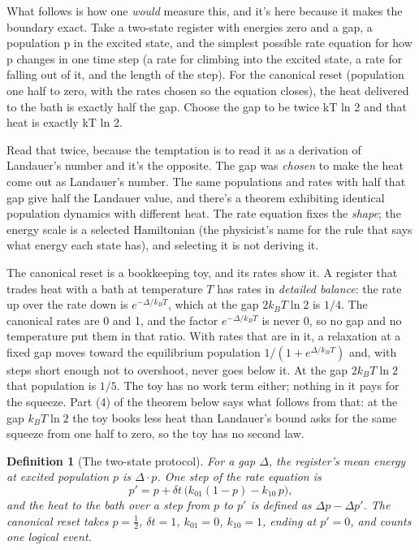 \documentclass[11pt,twoside]{article}
\theoremstyle{thielethm}
\theoremstyle{thieledef}
\newtheorem{definition}{Definition}[section]
\theoremstyle{thieledef}
\theoremstyle{thieledef}
\theoremstyle{thielethm}
\theoremstyle{thieleobs}
\theoremstyle{thielethm}
\begin{document}
What follows is how one \emph{would} measure this, and it's here because it makes the boundary exact. Take a two-state
register with energies zero and a gap, a population p in the excited state, and the simplest
possible rate equation for how p changes in one time step (a rate for climbing into the
excited state, a rate for falling out of it, and the length of the step). For the canonical reset
(population one half to zero, with the rates chosen so the equation closes), the heat
delivered to the bath is exactly half the gap. Choose the gap
to be twice kT ln 2 and that heat is exactly kT ln 2.

Read that twice, because the temptation is to read it as a derivation of Landauer's number
and it's the opposite. The gap was \emph{chosen} to make the heat come out as Landauer's number.
The same populations and rates with half that gap give half the Landauer value, and there's
a theorem exhibiting identical population dynamics with different heat. The rate equation fixes the \emph{shape}; the energy
scale is a selected Hamiltonian (the physicist's name for the rule that says what energy each
state has), and selecting it is not deriving it.

The canonical reset is a bookkeeping toy, and its rates show it. A register that trades heat
with a bath at temperature $T$ has rates in \emph{detailed balance}: the rate up over the rate
down is $e^{-\Delta/k_B T}$, which at the gap $2 k_B T \ln 2$ is $1/4$. The canonical rates are
0 and 1, and the factor $e^{-\Delta/k_B T}$ is never 0, so no gap and no temperature put them in
that ratio. With rates that are in it, a
relaxation at a fixed gap moves toward the equilibrium population $1/(1 + e^{\Delta/k_B T})$ and,
with steps short enough not to overshoot, never goes below it. At the
gap $2 k_B T \ln 2$ that population is $1/5$. The
toy has no work term either; nothing in it pays for the squeeze. Part (4) of the theorem below
says what follows from that: at the gap $k_B T \ln 2$ the toy books less heat than Landauer's bound
asks for the same squeeze from one half to zero, so the toy has no second law.

\begin{definition}[The two-state protocol]\label{def:u24-calorimeter}
For a gap $\Delta$, the register's mean energy at excited population $p$ is $\Delta \cdot p$.
One step of the rate equation is
\[
p' = p + \delta t \, \big(k_{01} (1 - p) - k_{10} \, p\big),
\]
and the heat to the bath over a step from $p$ to $p'$ is defined as $\Delta p - \Delta p'$. The
canonical reset takes $p = \tfrac12$, $\delta t = 1$, $k_{01} = 0$, $k_{10} = 1$, ending at
$p' = 0$, and counts one logical event.
\end{definition}
\end{document}
